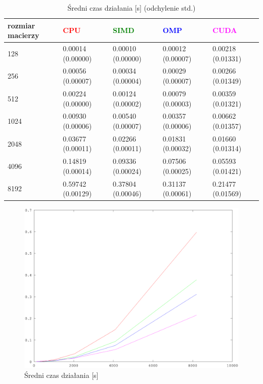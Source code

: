 \documentclass[11pt,a4paper]{article}
\begin{document}
\begin{table}[h!]
\begin{center}
\begin{tabular}{lllll}
\toprule
rozmiar macierzy & \textcolor{red}{CPU} & \textcolor{green}{SIMD} & \textcolor{blue}{OMP} & \textcolor{magenta}{CUDA} \\
\midrule
128 &  0.00014 (0.00000) &  0.00010 (0.00000) &  0.00012 (0.00007) &  0.00218 (0.01331) \\
256 &  0.00056 (0.00007) &  0.00034 (0.00004) &  0.00029 (0.00007) &  0.00266 (0.01349) \\
512 &  0.00224 (0.00000) &  0.00124 (0.00002) &  0.00079 (0.00003) &  0.00359 (0.01321) \\
1024 &  0.00930 (0.00006) &  0.00540 (0.00007) &  0.00357 (0.00006) &  0.00662 (0.01357) \\
2048 &  0.03677 (0.00011) &  0.02266 (0.00011) &  0.01831 (0.00032) &  0.01660 (0.01314) \\
4096 &  0.14819 (0.00014) &  0.09336 (0.00024) &  0.07506 (0.00025) &  0.05593 (0.01421) \\
8192 &  0.59742 (0.00129) &  0.37804 (0.00046) &  0.31137 (0.00061) &  0.21477 (0.01569) \\
\bottomrule
\end{tabular}
\caption{Średni czas działania [s] (odchylenie std.)}
\end{center}
\end{table}

\begin{figure}[h!]
\begin{center}
	\includegraphics[scale=0.45]{double_time}
	\caption{Średni czas działania [s]}
	\label{fig:double_time}
\end{center}
\end{figure}
\end{document}
